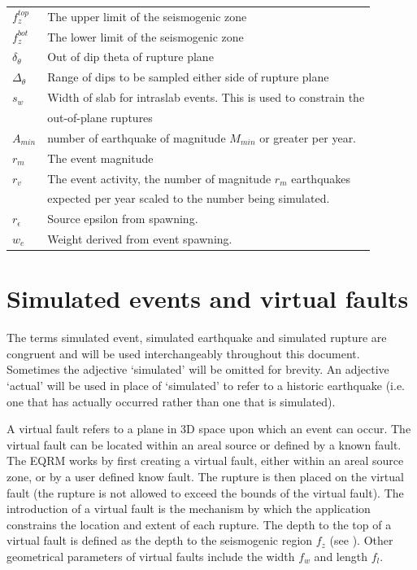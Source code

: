 \begin{table}
\begin{tabular}{l |  l}
$f_z^{top}$ & The upper limit of the seismogenic zone \\
$f_z^{bot}$ & The lower limit of the seismogenic zone \\ 
$\delta_\theta$ & Out of dip theta of rupture plane \\
$\Delta_\theta$ & Range of dips to be sampled either side of rupture plane \\
$s_w$ & Width of slab for intraslab events. This is used to constrain the \\
& out-of-plane ruptures \\
$A_{min}$ & number of earthquake of magnitude $M_{min}$ or greater per year. \\
$r_m$ & The event magnitude  \\ 
$r_v$ & The event activity, the number of magnitude $r_m$ earthquakes \\
& expected per year scaled to the number being simulated. \\
$r_\epsilon$ & Source epsilon from spawning. \\
$w_e$ & Weight derived from event spawning. \\
\hline
\end{tabular}
\end{table}


\section{Simulated events and virtual faults}

The terms simulated event, simulated
earthquake and simulated
rupture are congruent and will be used
interchangeably throughout this document. Sometimes the adjective
`simulated' will be omitted for brevity. An adjective `actual'
will be used in place of `simulated' to refer to a historic
earthquake (i.e. one that has actually occurred rather than one
that is simulated).

A virtual fault refers to a plane in 3D space upon which an event can
occur.  The virtual fault can be located within an areal source or defined by a known fault. 
The EQRM works by first creating a virtual fault, either within an
areal source zone, or by a user defined know fault. The rupture is then placed 
on the virtual fault (the
rupture is not allowed to exceed the bounds of the virtual
fault). The introduction of a virtual
fault is the mechanism by which the
 application constrains the location and extent
of each rupture. The depth to the top of a virtual
fault is defined as the depth to the
seismogenic region $f_z$ (see
). Other geometrical parameters
of virtual faults include the width $f_w$ and
length $f_l$. 


